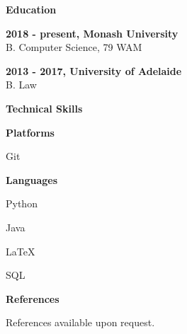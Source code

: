 \documentclass[a4paper, 11pt, draft]{memoir}
\newcommand{\Sep}{\vspace{1.0em}}
\newcommand{\SmallSep}{\vspace{0.5em}}
\newcommand{\CVSection}[1]
	{\Large\textbf{#1}\par
	\SmallSep\normalsize\normalfont}
\newcommand{\CVItem}[1]
	{\textbf{\color{RoyalBlue} #1}}
\begin{document}
    \CVSection{Education}
    \CVItem{2018 - present, Monash University}\\
    B. Computer Science, 79 WAM
    \SmallSep
    
    \CVItem{2013 - 2017, University of Adelaide}\\
    B. Law
    \Sep
    
    \CVSection{Technical Skills}
    \CVItem{Platforms}
    \begin{multicols}{2}
    \begin{compactitem}[\color{RoyalBlue}$\circ$]
        \item Git
    \end{compactitem}
    \end{multicols}
    \SmallSep
    
    \CVItem{Languages}
    \begin{multicols}{2}
    \begin{compactitem}[\color{RoyalBlue}$\circ$]
        \item Python
        \item Java
        \item LaTeX
        \item SQL
    \end{compactitem}
    \end{multicols}
    \Sep 

    \CVSection{References}
    References available upon request.
    
\end{document}
